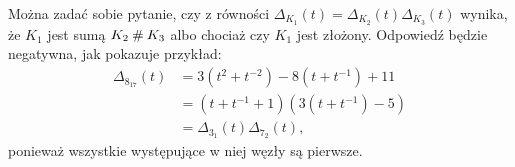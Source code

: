 Można zadać sobie pytanie, czy z równości $\Delta_{K_1}(t) = \Delta_{K_2}(t) \Delta_{K_3}(t)$ wynika, że $K_1$ jest sumą $K_2 \mathbin{\#} K_3$ albo chociaż czy $K_1$ jest złożony.
Odpowiedź będzie negatywna, jak pokazuje przykład:
\begin{align}
    \Delta_{8_{17}}(t) & = 3(t^2 +t^{-2}) -8(t+t^{-1}) + 11 \\
    & = (t+t^{-1} + 1) (3(t+t^{-1}) - 5) \\
    & = \Delta_{3_1}(t) \Delta_{7_2}(t),
\end{align}
ponieważ wszystkie występujące w niej węzły są pierwsze.


